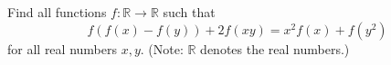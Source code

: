 Find all functions $f:\mathbb{R}\to\mathbb{R}$ such that \[f\left(f\left(x\right)-f\left(y\right)\right)+2f\left(xy\right)=x^2f\left(x\right)+f\left(y^2\right)\] for all real numbers $x,y$. (Note: $\mathbb{R}$ denotes the real numbers.)